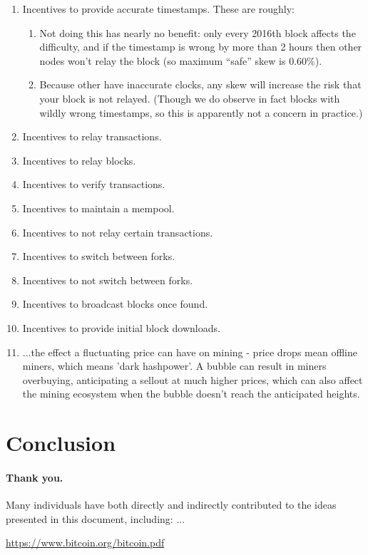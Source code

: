 \documentclass[letterpaper]{article}
\begin{document}
\begin{enumerate}
\item Incentives to provide accurate timestamps. These are roughly:
\begin{enumerate}
\item Not doing this has nearly no benefit: only every 2016th block affects the
difficulty, and if the timestamp is wrong by more than 2 hours then other nodes
won't relay the block (so maximum ``safe'' skew is 0.60\%).
\item Because other have inaccurate clocks, any skew will increase the risk that
your block is not relayed. (Though we do observe in fact blocks with wildly wrong
timestamps, so this is apparently not a concern in practice.)
\end{enumerate}

\item Incentives to relay transactions.

\item Incentives to relay blocks.

\item Incentives to verify transactions.

\item Incentives to maintain a mempool.

\item Incentives to not relay certain transactions.

\item Incentives to switch between forks.

\item Incentives to not switch between forks.

\item Incentives to broadcast blocks once found.

\item Incentives to provide initial block downloads.

\item ...the effect a fluctuating price can have on mining - price drops mean offline miners, which means 'dark hashpower'. A bubble can result in miners overbuying, anticipating a sellout at much higher prices, which can also affect the mining ecosystem when the bubble doesn't reach the anticipated heights.

\end{enumerate}

\section{Conclusion}

\paragraph{Thank you.} Many individuals have both directly and indirectly contributed to the ideas presented in this document, including: ...

\begin{thebibliography}{9}
 \url{https://www.bitcoin.org/bitcoin.pdf}
\end{thebibliography}
\end{document}
